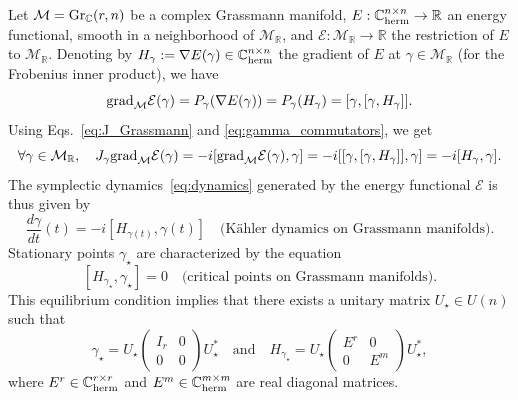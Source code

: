 \documentclass[11pt]{article}
\def\R{{\mathbb R}}
\def\C{{\mathbb C}}
\begin{document}
Let $\mathcal M={\rm Gr}_\C(r,n)$ be a complex Grassmann manifold, $E: \C^{n \times n}_{\rm herm} \to \R$ an energy functional, smooth in a neighborhood of $\mathcal M_\R$, and $\mathcal E : \mathcal M_\R \to \R$ the restriction of $E$ to $\mathcal M_\R$. Denoting by $H_\gamma:=\nabla E(\gamma) \in \C^{n \times n}_{\rm herm}$ the gradient of $E$ at $\gamma \in \mathcal M_\R$ (for the Frobenius inner product), we have 
\begin{equation} \label{eq:proj_grad_grassmann}
{\rm grad}_{\mathcal M} \mathcal E(\gamma) = P_\gamma(\nabla E(\gamma)) = P_\gamma (H_\gamma) = [\gamma,[\gamma,H_\gamma]].
\end{equation}
Using Eqs.~\eqref{eq:J_Grassmann} and \eqref{eq:gamma_commutators}, we get
$$
\forall \gamma \in \mathcal M_\R, \quad  J_\gamma {\rm grad}_{\mathcal M} \mathcal E(\gamma) = -i [{\rm grad}_{\mathcal M}\mathcal E(\gamma),\gamma] = 
- i [[\gamma,[\gamma,H_\gamma]],\gamma] = -i [H_\gamma,\gamma].
$$
The symplectic dynamics~\eqref{eq:dynamics} generated by the energy functional $\mathcal E$ is thus given by
\begin{equation}\label{eq:dynamics_on_Grassmann}
{\frac{d\gamma}{dt}(t) = -i [H_{\gamma(t)},\gamma(t)] \quad \mbox{(K\"ahler dynamics on Grassmann manifolds)}.}
\end{equation}
Stationary points $\gamma_\star$ are characterized by the equation
\begin{equation} \label{eq:critical_point_Grassmann}
{[H_{\gamma_\star},\gamma_\star]=0} \quad \mbox{(critical points on Grassmann manifolds)}.
\end{equation}
This equilibrium condition implies that there exists a unitary matrix $U_\star \in U(n)$ such that 
\begin{equation}\label{eq:diag_H*}
\gamma_\star = U_\star \left( \begin{array}{cc} I_r & 0 \\ 0 & 0 \end{array} \right) U_\star^* \quad \mbox{and} \quad H_{\gamma_\star} = U_\star \left( \begin{array}{cc} E^r & 0 \\ 0 & E^m \end{array} \right) U_\star^*,
\end{equation}
where $E^r \in \C^{r \times r}_{\rm herm}$ and $E^m \in \C^{m \times m}_{\rm herm}$ are real diagonal matrices. 

\medskip
\end{document}
